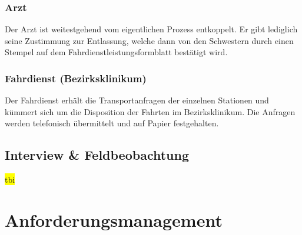 \documentclass[a4paper, ngerman, 12pt]{scrartcl}
\begin{document}
\subsubsection{Arzt}
Der Arzt ist weitestgehend vom eigentlichen Prozess entkoppelt. Er gibt lediglich seine Zustimmung zur Entlassung, welche dann von den Schwestern durch einen Stempel auf dem Fahrdienstleistungsformblatt bestätigt wird.
\subsubsection{Fahrdienst (Bezirksklinikum)}
Der Fahrdienst erhält die Transportanfragen der einzelnen Stationen und kümmert sich um die Disposition der Fahrten im Bezirksklinikum. Die Anfragen werden telefonisch übermittelt und auf Papier festgehalten.
\subsection{Interview \& Feldbeobachtung}
\colorbox{yellow}{tbi}\\
\section{Anforderungsmanagement}
\end{document}
